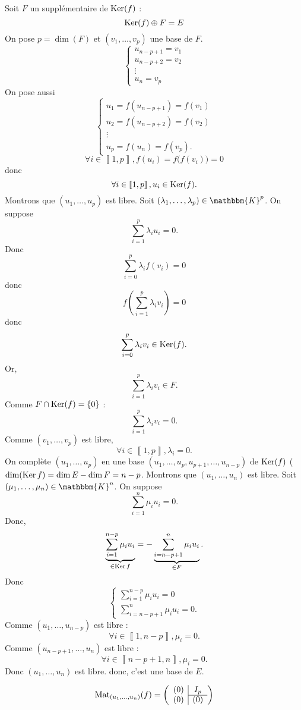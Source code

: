 \begin{itemize}
	Soit $F$ un supplémentaire de $\operatorname{Ker}(f)$ : \[
		\operatorname{Ker}(f) \oplus F = E
	\]
	On pose $p = \dim(F)$ et $(v_1, \ldots, v_p)$ une base de $F$. \[
		\begin{cases}
			u_{n-p+1} = v_1\\
			u_{n-p+2} = v_2\\
			\vdots\\
			u_n = v_p
		\end{cases}
	\] On pose aussi \[
		\begin{cases}
			u_1 = f(u_{n-p+1}) = f(v_1)\\
			u_2 = f(u_{n-p+2}) = f(v_2)\\
			\vdots\\
			u_p = f(u_n) = f(v_p).
		\end{cases}
	\] \[
		\forall i \in \left\llbracket 1,p \right\rrbracket, f(u_i) = f\big(f(v_i)\big) = 0
	\] donc \[
		\forall i \in \left\llbracket 1,p \right\rrbracket, u_i \in \operatorname{Ker}(f).
	\] Montrons que $(u_1, \ldots, u_p)$ est libre. Soit $(\lambda_1, \ldots, \lambda_p) \in \mathbbm{K}^p$. On suppose \[
		\sum_{i=1}^p \lambda_i u_i = 0.
	\] Donc \[
		\sum_{i=0}^{p}\lambda_i f(v_i) = 0
	\] donc \[
		f\left( \sum_{i=1}^p \lambda_i v_i \right) = 0
	\] donc \[
		\sum_{i=0}^p \lambda_i v_i \in \operatorname{Ker}(f).
	\]Or, \[
		\sum_{i=1}^p \lambda_i v_i \in F.
	\] Comme $F \cap \operatorname{Ker}(f) = \{0\}$ : \[
		\sum_{i=1}^p \lambda_i v_i = 0.
	\] Comme $(v_1, \ldots, v_p)$ est libre, \[
		\forall i \in \left\llbracket 1,p \right\rrbracket, \lambda_i = 0.
	\] On complète $(u_1, \ldots, u_p)$ en une base $(u_1, \ldots, u_p, u_{p+1}, \ldots, u_{n-p})$ de $\operatorname{Ker}(f)$ ($\dim(\operatorname{Ker} f) = \dim E - \dim F = n - p$.
	Montrons que $(u_1, \ldots, u_n)$ est libre. Soit $(\mu_1, \ldots, \mu_n) \in \mathbbm{K}^n$. On suppose \[
		\sum_{i=1}^n \mu_i u_i = 0.
	\] Donc, \[
		\underbrace{\sum_{i=1}^{n-p} \mu_i u_i}_{\in \operatorname{Ker} f} = -\underbrace{\sum_{i=n-p+1}^n \mu_i u_i}_{\in F}.
	\] Donc \[
		\begin{cases}
			\sum_{i=1}^{n-p} \mu_i u_i = 0\\
			\sum_{i=n - p+1}^n \mu_i u_i = 0.
		\end{cases}
	\] Comme $(u_1, \ldots, u_{n-p})$ est libre : \[
		\forall i \in \left\llbracket 1,n-p \right\rrbracket, \mu_i = 0.
	\] Comme $(u_{n-p+1}, \ldots, u_n)$ est libre : \[
		\forall i \in \left\llbracket n-p+1,n \right\rrbracket, \mu_i = 0.
	\] Donc $(u_1, \ldots, u_{n})$ est libre. donc, c'est une base de $E$.

	\[
		\Mat_{(u_1, \ldots, u_{n})}(f) = \left(
			\begin{array}{c|c}
				(0)&I_p\\ \cline{2-1}
				(0)&(0)
			\end{array}
		\right) 
	\] 
\end{itemize}
